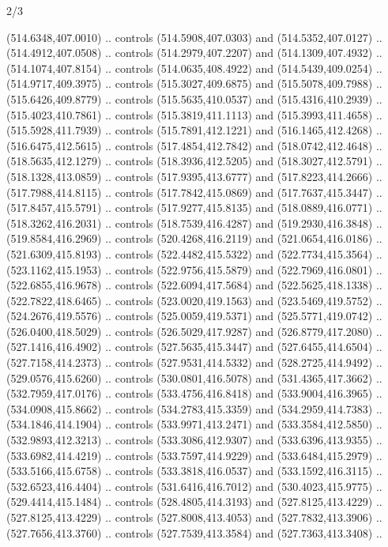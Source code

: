 \begin{flagdescription}{2/3}
\begin{scope}[xshift=0.5\flaglength,yshift=0.5\flagwidth,scale=\flagwidth/495.65]
\begin{scope}[y=0.8pt, x=0.8pt, yscale=-1,shift={(-463.76,-309.78)}]
  (514.6348,407.0010) .. controls (514.5908,407.0303) and (514.5352,407.0127) ..
  (514.4912,407.0508) .. controls (514.2979,407.2207) and (514.1309,407.4932) ..
  (514.1074,407.8154) .. controls (514.0635,408.4922) and (514.5439,409.0254) ..
  (514.9717,409.3975) .. controls (515.3027,409.6875) and (515.5078,409.7988) ..
  (515.6426,409.8779) .. controls (515.5635,410.0537) and (515.4316,410.2939) ..
  (515.4023,410.7861) .. controls (515.3819,411.1113) and (515.3993,411.4658) ..
  (515.5928,411.7939) .. controls (515.7891,412.1221) and (516.1465,412.4268) ..
  (516.6475,412.5615) .. controls (517.4854,412.7842) and (518.0742,412.4648) ..
  (518.5635,412.1279) .. controls (518.3936,412.5205) and (518.3027,412.5791) ..
  (518.1328,413.0859) .. controls (517.9395,413.6777) and (517.8223,414.2666) ..
  (517.7988,414.8115) .. controls (517.7842,415.0869) and (517.7637,415.3447) ..
  (517.8457,415.5791) .. controls (517.9277,415.8135) and (518.0889,416.0771) ..
  (518.3262,416.2031) .. controls (518.7539,416.4287) and (519.2930,416.3848) ..
  (519.8584,416.2969) .. controls (520.4268,416.2119) and (521.0654,416.0186) ..
  (521.6309,415.8193) .. controls (522.4482,415.5322) and (522.7734,415.3564) ..
  (523.1162,415.1953) .. controls (522.9756,415.5879) and (522.7969,416.0801) ..
  (522.6855,416.9678) .. controls (522.6094,417.5684) and (522.5625,418.1338) ..
  (522.7822,418.6465) .. controls (523.0020,419.1563) and (523.5469,419.5752) ..
  (524.2676,419.5576) .. controls (525.0059,419.5371) and (525.5771,419.0742) ..
  (526.0400,418.5029) .. controls (526.5029,417.9287) and (526.8779,417.2080) ..
  (527.1416,416.4902) .. controls (527.5635,415.3447) and (527.6455,414.6504) ..
  (527.7158,414.2373) .. controls (527.9531,414.5332) and (528.2725,414.9492) ..
  (529.0576,415.6260) .. controls (530.0801,416.5078) and (531.4365,417.3662) ..
  (532.7959,417.0176) .. controls (533.4756,416.8418) and (533.9004,416.3965) ..
  (534.0908,415.8662) .. controls (534.2783,415.3359) and (534.2959,414.7383) ..
  (534.1846,414.1904) .. controls (533.9971,413.2471) and (533.3584,412.5850) ..
  (532.9893,412.3213) .. controls (533.3086,412.9307) and (533.6396,413.9355) ..
  (533.6982,414.4219) .. controls (533.7597,414.9229) and (533.6484,415.2979) ..
  (533.5166,415.6758) .. controls (533.3818,416.0537) and (533.1592,416.3115) ..
  (532.6523,416.4404) .. controls (531.6416,416.7012) and (530.4023,415.9775) ..
  (529.4414,415.1484) .. controls (528.4805,414.3193) and (527.8125,413.4229) ..
  (527.8125,413.4229) .. controls (527.8008,413.4053) and (527.7832,413.3906) ..
  (527.7656,413.3760) .. controls (527.7539,413.3584) and (527.7363,413.3408) ..

\end{scope}
\end{scope}
\end{flagdescription}
